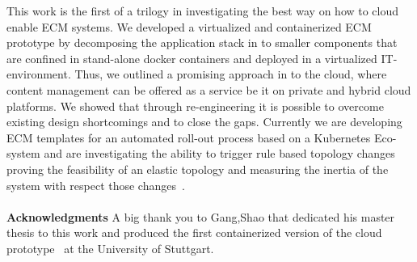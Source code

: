 \documentclass[EPiC]{easychair} %
\begin{document}
    This work is the first of a trilogy in investigating the best way on how to cloud enable ECM systems. We developed a virtualized and containerized ECM prototype by decomposing the application stack in to smaller components that are confined in stand-alone docker containers and deployed in a virtualized IT-environment. Thus, we outlined a promising approach in to the cloud, where content management can be offered as a service be it on private and hybrid cloud platforms. We showed that through re-engineering it is possible to overcome existing design shortcomings and to close the gaps. Currently we are developing ECM templates for an automated roll-out process based on a Kubernetes Eco-system and are investigating the ability to trigger rule based topology changes proving the feasibility of an elastic topology and  measuring the inertia of the system with respect those changes~\cite{Mega2014}.\\\\
\noindent\textbf{Acknowledgments}
\label{sect:acks}
A big thank you to Gang,Shao that dedicated his master thesis to this work and produced the first containerized version of the cloud prototype~\cite{gang-shao} at the University of Stuttgart.
\label{sect:bib}

%
%
%


\end{document}
